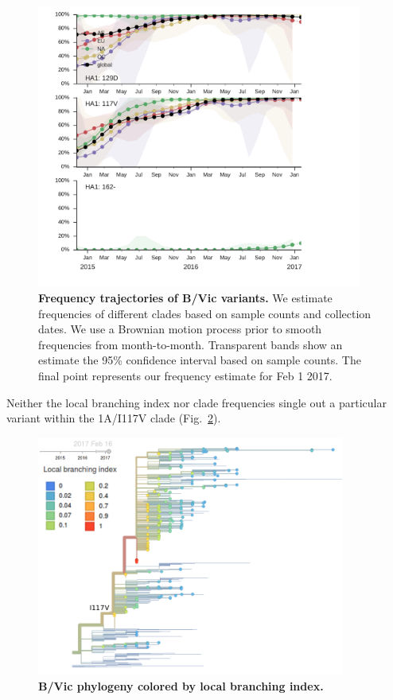\documentclass[11pt,oneside,letterpaper]{article}
\begin{document}
\begin{figure}[H]
	\centering
	\includegraphics[width=0.95\textwidth]{../figures/feb-2017/vic_frequencies.pdf}
	\caption{\textbf{Frequency trajectories of B/Vic variants.}
	We estimate frequencies of different clades based on sample counts and collection dates.
	We use a Brownian motion process prior to smooth frequencies from month-to-month.
	Transparent bands show an estimate the 95\% confidence interval based on sample counts.
	The final point represents our frequency estimate for Feb 1 2017.
	}
	\label{Vic_mutations}
\end{figure}

\pagebreak

Neither the local branching index nor clade frequencies single out a particular variant within the 1A/I117V clade (Fig.\ \ref{Vic_lbi}).

\begin{figure}[H]
	\centering
	\includegraphics[width=0.9\textwidth]{../figures/feb-2017/Vic_lbi.png}
	\caption{\textbf{B/Vic phylogeny colored by local branching index.}
	}
	\label{Vic_lbi}
\end{figure}
\end{document}
